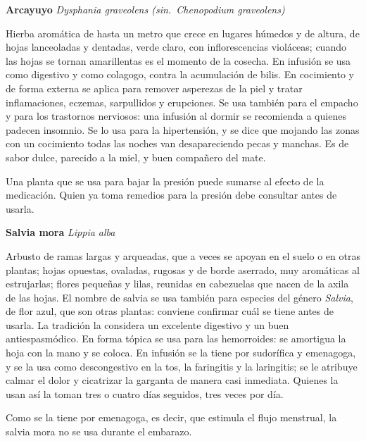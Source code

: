\documentclass[11pt,twoside,openright]{book}
\newcommand{\necesita}[1]{%
  \par\ifdim\dimexpr\pagegoal-\pagetotal\relax<#1\relax\newpage\fi}
\newenvironment{planta}[3]{%
  \par\necesita{8\baselineskip}\vspace{1.4em}\noindent
  {\sffamily\bfseries\large\color{verdehuerta}#1}\quad
  {\itshape\small\color{gris}#2}\par
  \vspace{0.15em}
  \noindent{\color{verdehoja}\rule{\textwidth}{0.6pt}}\par
  \vspace{0.25em}
  \noindent{\sffamily\scriptsize\color{terracota}\MakeUppercase{Se usa: }#3}\par
  \vspace{0.55em}\small\ignorespaces
}{\par\vspace{0.4em}}
\newcommand{\sinon}[1]{\textup{(sin.~}#1\textup{)}}
\begin{document}
\begin{planta}{Arcayuyo}{Dysphania graveolens \sinon{Chenopodium graveolens}}{Hojas e inflorescencias}
\label{pl-arcayuyo}%
Hierba aromática de hasta un metro que crece en lugares húmedos y de altura, de
hojas lanceoladas y dentadas, verde claro, con inflorescencias
violáceas; cuando las hojas se tornan amarillentas es el momento de la
cosecha. En infusión se usa como digestivo y como colagogo, contra la
acumulación de bilis. En cocimiento y de forma externa se aplica para
remover asperezas de la piel y tratar inflamaciones, eczemas,
sarpullidos y erupciones. Se usa también para el empacho y para los
trastornos nerviosos: una infusión al dormir se recomienda a
quienes padecen insomnio. Se lo usa para la hipertensión, y se dice que
mojando las zonas con un cocimiento todas las noches van desapareciendo
pecas y manchas. Es de sabor dulce, parecido a la miel, y buen compañero
del mate.
\begin{cuidado}
Una planta que se usa para bajar la presión puede sumarse al efecto de
la medicación. Quien ya toma remedios para la presión debe consultar
antes de usarla.
\end{cuidado}
\end{planta}

\begin{planta}{Salvia mora}{Lippia alba}{Hojas y flores}
\label{pl-salvia}%
Arbusto de ramas largas y arqueadas, que a veces se apoyan en el suelo o
en otras plantas; hojas opuestas, ovaladas, rugosas y de borde aserrado,
muy aromáticas al estrujarlas; flores pequeñas y lilas, reunidas en
cabezuelas que nacen de la axila de las hojas. El nombre de salvia se
usa también para especies del género \textit{Salvia}, de flor azul, que
son otras plantas: conviene confirmar cuál se tiene antes de usarla.
La tradición la considera un excelente digestivo y un buen
antiespasmódico. En forma tópica se usa para las hemorroides: se amortigua la
hoja con la mano y se coloca. En infusión se la tiene por sudorífica y
emenagoga, y se la usa como descongestivo en la tos, la faringitis y la laringitis;
se le atribuye calmar el dolor y cicatrizar la garganta de
manera casi inmediata. Quienes la usan así la toman tres o cuatro
días seguidos, tres veces por día.
\begin{cuidado}[No en el embarazo]
Como se la tiene por emenagoga, es decir, que estimula el flujo
menstrual, la salvia mora no se usa durante el embarazo.
\end{cuidado}
\end{planta}
\end{document}
